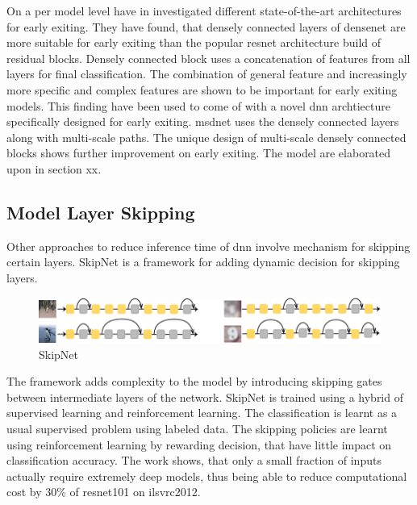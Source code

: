 On a per model level \citeauthor{huang_multi-scale_2017} have in \cite{huang_multi-scale_2017} investigated different state-of-the-art architectures for early exiting. They have found, that  densely connected layers of \gls{densenet} \cite{huang_densely_2016} are more suitable for early exiting than the popular \gls{resnet} architecture build of residual blocks. Densely connected block uses a concatenation of features from all layers for final classification. The combination of  general feature and increasingly more specific and complex features are shown to be important for early exiting models. This finding have been used to come of with a novel \gls{dnn} archtiecture specifically designed for early exiting. \gls{msdnet} \cite{huang_multi-scale_2017} uses the densely connected layers along with multi-scale paths. The unique design of multi-scale densely connected blocks shows further improvement on early exiting. The model are elaborated upon in section xx.


\subsection{Model Layer Skipping}

Other approaches to reduce inference time of \gls{dnn} involve mechanism for skipping certain layers. SkipNet \cite{wang_skipnet:_2017} is a framework for adding dynamic decision for skipping layers. 

\begin{figure}
	\centering
	\includegraphics[width=\linewidth]{figures/models/skipnet}
	\caption[SkipNet]{SkipNet}
\end{figure}

The framework adds complexity to the model by introducing skipping gates between intermediate layers of the network. SkipNet is trained using a hybrid of supervised learning and reinforcement learning. The classification is learnt as a usual supervised problem using labeled data. The skipping policies are learnt using reinforcement learning by rewarding decision, that have little impact on classification accuracy. The work shows, that only a small fraction of inputs actually require extremely deep models, thus being able to reduce computational cost by 30\% of \gls{resnet}101 on \gls{ilsvrc2012}. 

